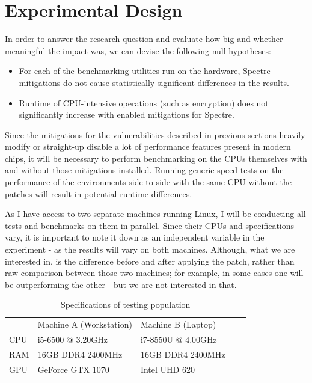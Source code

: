 \documentclass{csfourzero}
\begin{document}
\section{Experimental Design}
\label{sec:exp}
In order to answer the research question and evaluate how big and whether meaningful the impact was, we can devise the following null hypotheses: 
\begin{itemize}
  \item For each of the benchmarking utilities run on the hardware, Spectre mitigations do not cause statistically significant differences in the results.
  \item Runtime of CPU-intensive operations (such as encryption) does not significantly increase with enabled mitigations for Spectre.
\end{itemize}

Since the mitigations for the vulnerabilities described in previous sections heavily modify or straight-up disable a lot of performance features present in modern chips, it will be necessary to perform benchmarking on the CPUs themselves with and without those mitigations installed. Running generic speed tests on the performance of the environments side-to-side with the same CPU without the patches will result in potential runtime differences.

As I have access to two separate machines running Linux, I will be conducting all tests and benchmarks on them in parallel. Since their CPUs and specifications vary, it is important to note it down as an independent variable in the experiment - as the results will vary on both machines. Although, what we are interested in, is the difference before and after applying the patch, rather than raw comparison between those two machines; for example, in some cases one will be outperforming the other - but we are not interested in that.


\begin{table}[h]
\centering
\begin{tabular}{|l|l|l|ll}
\cline{1-3}
    & Machine A (Workstation)         & Machine B (Laptop) &  &  \\ \cline{1-3}
CPU & i5-6500 @ 3.20GHz & i7-8550U @ 4.00GHz       &  &  \\ \cline{1-3}
RAM & 16GB DDR4 2400MHz & 16GB DDR4 2400MHz          &  &  \\ \cline{1-3}
GPU & GeForce GTX 1070  & Intel UHD 620          &  &  \\ \cline{1-3}
\end{tabular}%
\caption{Specifications of testing population}
\label{tab:machines}
\end{table}
\end{document}
